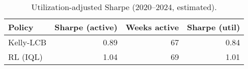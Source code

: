 \begin{table}[t]
  \centering
  \small
  \caption{Utilization-adjusted Sharpe (2020–2024, estimated).}
  \begin{tabular}{lrrr}
    \toprule
    Policy & Sharpe (active) & Weeks active & Sharpe (util) \\
    \midrule
    Kelly-LCB & 0.89 & 67 & 0.84 \\
    RL (IQL)  & 1.04 & 69 & 1.01 \\
    \bottomrule
  \end{tabular}
\end{table}
